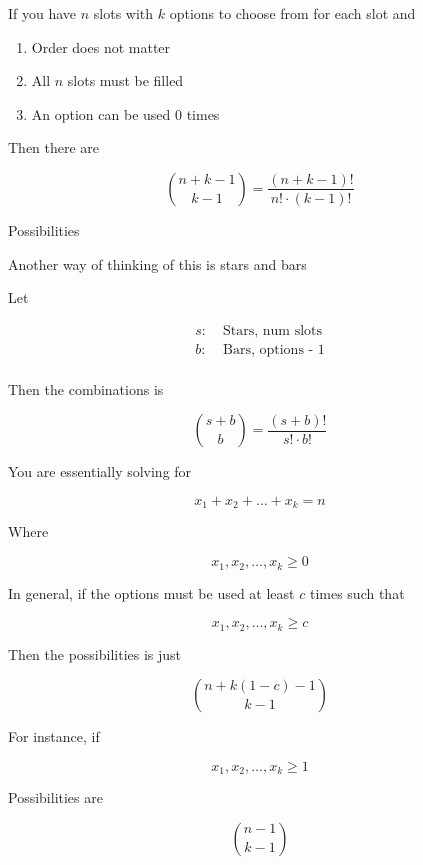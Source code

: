 \documentclass[../../Main.tex]{subfiles}
\begin{document}
\begin{definition}
    If you have $n$ slots with $k$ options to choose from for each slot and

    \begin{enumerate}
        \item Order does not matter
        \item All $n$ slots must be filled
        \item An option can be used 0 times
    \end{enumerate}

    Then there are 

    $${n + k - 1 \choose k - 1} = \frac{(n + k - 1)!}{n! \cdot (k - 1)!}$$

    Possibilities

    Another way of thinking of this is stars and bars

    Let

    \begin{align*}
        s: &\; \text{Stars, num slots} \\
        b: &\; \text{Bars, options - 1} \\
    \end{align*}

    Then the combinations is

    $${s + b \choose b} = \frac{(s + b)!}{s! \cdot b!}$$

    You are essentially solving for

    $$x_1 + x_2 + \ldots + x_k = n$$

    Where

    $$x_1, x_2, \ldots, x_k \geq 0$$

    In general, if the options must be used at least $c$ times such that
    
    $$x_1, x_2, \ldots, x_k \geq c$$

    Then the possibilities is just

    $${n + k(1 - c) - 1 \choose k - 1}$$

    For instance, if 

    $$x_1, x_2, \ldots, x_k \geq 1$$

    Possibilities are

    $${n - 1 \choose k - 1}$$


\end{definition}

\end{document}
